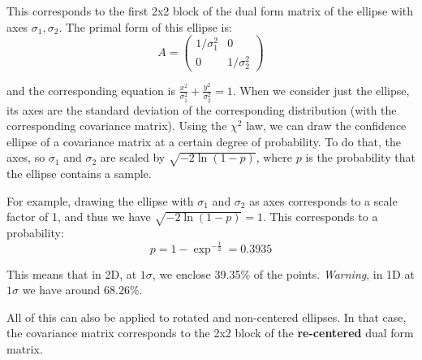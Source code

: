 This corresponds to the first 2x2 block of the dual form matrix of the ellipse with axes $\sigma_1, \sigma_2$.
The primal form of this ellipse is:
\begin{equation}
    A = \left(\begin{array}{cc}
        1/\sigma_1^2 & 0 \\
        0 & 1/\sigma_2^2
    \end{array}\right)
\end{equation}

and the corresponding equation is $\frac{x^2}{\sigma_1^2}+\frac{y^2}{\sigma_2^2} = 1$. When we consider just the ellipse, its axes are the standard deviation of the corresponding distribution (with the corresponding covariance matrix).
Using the $\chi^2$ law, we can draw the confidence ellipse of a covariance matrix at a certain degree of probability.
To do that, the axes, so $\sigma_1$ and $\sigma_2$ are scaled by $\sqrt{-2\ln{(1-p)}}$, where $p$ is the probability that the ellipse contains a sample.


For example, drawing the ellipse with $\sigma_1$ and $\sigma_2$ as axes corresponds to a scale factor of 1, and thus we have $\sqrt{-2\ln{(1-p)}} = 1$.
This corresponds to a probability:
\begin{equation}
    p = 1-\exp^{-\frac{1}{2}} = 0.3935
\end{equation}

This means that in 2D, at $1 \sigma$, we enclose 39.35\% of the points. \textit{Warning}, in 1D at $1 \sigma$ we have around 68.26\%.

All of this can also be applied to rotated and non-centered ellipses. In that case, the covariance matrix corresponds to the 2x2 block of the \textbf{re-centered} dual form matrix.


